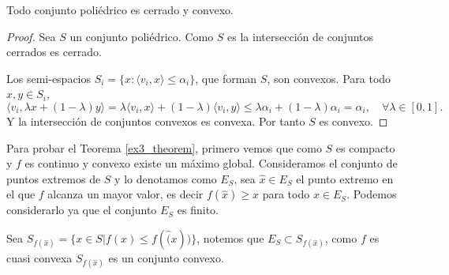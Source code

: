 \begin{lema}\label{ex3_lema_convexity}
    Todo conjunto poliédrico es cerrado y convexo.
\end{lema}

\begin{proof}
    Sea $S$ un conjunto poliédrico.
    Como $S$ es la intersección de conjuntos cerrados es cerrado.

    Los semi-espacios $S_i = \{ x : \langle v_i, x \rangle \leq \alpha_i \}$, que forman $S$, son convexos.
    Para todo $x, y \in S_i$,
    \begin{equation*}
        \langle v_i, \lambda x + (1 - \lambda) y \rangle
        = \lambda \langle v_i, x \rangle + (1 - \lambda) \langle v_i, y \rangle
        \leq \lambda \alpha_i + (1 - \lambda) \alpha_i
        = \alpha_i, \quad \forall \lambda \in [0,1].
    \end{equation*}
    Y la intersección de conjuntos convexos es convexa.
    Por tanto $S$ es convexo.
\end{proof}

Para probar el Teorema \ref{ex3_theorem},
primero vemos que como $S$ es compacto y $f$ es continuo y convexo existe un máximo global.
Consideramos el conjunto de puntos extremos de $S$ y lo denotamos como $E_S$,
sea $\hat{x} \in E_S$ el punto extremo en el que $f$ alcanza un mayor valor,
es decir $f(\hat{x}) \geq x$ para todo $x \in E_S$.
Podemos considerarlo ya que el conjunto $E_S$ es finito.

Sea $S_{f(\hat{x})} = \{ x \in S | f(x) \leq f(\hat(x)) \}$,
notemos que $E_S \subset S_{f(\hat{x})}$,
como $f$ es cuasi convexa $S_{f(\hat{x})}$ es un conjunto convexo.

